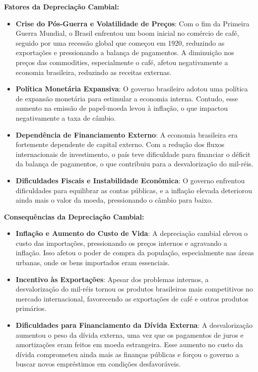 \documentclass[a4paper,12pt]{article}[abntex2]
\begin{document}
\textbf{Fatores da Depreciação Cambial:}
\begin{itemize}
    \item \textbf{Crise do Pós-Guerra e Volatilidade de Preços}: Com o fim da Primeira Guerra Mundial, o Brasil enfrentou um boom inicial no comércio de café, seguido por uma recessão global que começou em 1920, reduzindo as exportações e pressionando a balança de pagamentos. A diminuição nos preços das commodities, especialmente o café, afetou negativamente a economia brasileira, reduzindo as receitas externas.
    \item \textbf{Política Monetária Expansiva}: O governo brasileiro adotou uma política de expansão monetária para estimular a economia interna. Contudo, esse aumento na emissão de papel-moeda levou à inflação, o que impactou negativamente a taxa de câmbio.
    \item \textbf{Dependência de Financiamento Externo}: A economia brasileira era fortemente dependente de capital externo. Com a redução dos fluxos internacionais de investimento, o país teve dificuldade para financiar o déficit da balança de pagamentos, o que contribuiu para a desvalorização do mil-réis.
    \item \textbf{Dificuldades Fiscais e Instabilidade Econômica}: O governo enfrentou dificuldades para equilibrar as contas públicas, e a inflação elevada deteriorou ainda mais o valor da moeda, pressionando o câmbio para baixo.
\end{itemize}

\textbf{Consequências da Depreciação Cambial:}
\begin{itemize}
    \item \textbf{Inflação e Aumento do Custo de Vida}: A depreciação cambial elevou o custo das importações, pressionando os preços internos e agravando a inflação. Isso afetou o poder de compra da população, especialmente nas áreas urbanas, onde os bens importados eram essenciais.
    \item \textbf{Incentivo às Exportações}: Apesar dos problemas internos, a desvalorização do mil-réis tornou os produtos brasileiros mais competitivos no mercado internacional, favorecendo as exportações de café e outros produtos primários.
    \item \textbf{Dificuldades para Financiamento da Dívida Externa}: A desvalorização aumentou o peso da dívida externa, uma vez que os pagamentos de juros e amortizações eram feitos em moeda estrangeira. Esse aumento no custo da dívida comprometeu ainda mais as finanças públicas e forçou o governo a buscar novos empréstimos em condições desfavoráveis.
\end{itemize}
\end{document}
